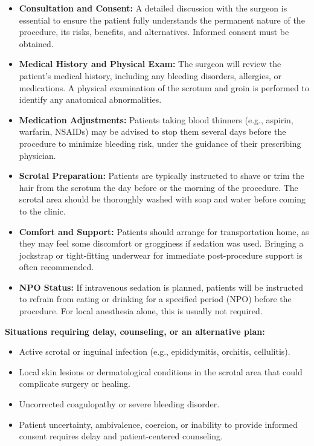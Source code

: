 \begin{itemize}
  \item \textbf{Consultation and Consent:} A detailed discussion with the surgeon is essential to ensure the patient fully understands the permanent nature of the procedure, its risks, benefits, and alternatives. Informed consent must be obtained.
  
  \item \textbf{Medical History and Physical Exam:} The surgeon will review the patient's medical history, including any bleeding disorders, allergies, or medications. A physical examination of the scrotum and groin is performed to identify any anatomical abnormalities.
  
  \item \textbf{Medication Adjustments:} Patients taking blood thinners (e.g., aspirin, warfarin, NSAIDs) may be advised to stop them several days before the procedure to minimize bleeding risk, under the guidance of their prescribing physician.
  
  \item \textbf{Scrotal Preparation:} Patients are typically instructed to shave or trim the hair from the scrotum the day before or the morning of the procedure. The scrotal area should be thoroughly washed with soap and water before coming to the clinic.
  
  \item \textbf{Comfort and Support:} Patients should arrange for transportation home, as they may feel some discomfort or grogginess if sedation was used. Bringing a jockstrap or tight-fitting underwear for immediate post-procedure support is often recommended.
  
  \item \textbf{NPO Status:} If intravenous sedation is planned, patients will be instructed to refrain from eating or drinking for a specified period (NPO) before the procedure. For local anesthesia alone, this is usually not required.
\end{itemize}

\textbf{Situations requiring delay, counseling, or an alternative plan:}
\begin{itemize}
  \item Active scrotal or inguinal infection (e.g., epididymitis, orchitis, cellulitis).
  \item Local skin lesions or dermatological conditions in the scrotal area that could complicate surgery or healing.
  \item Uncorrected coagulopathy or severe bleeding disorder.
  \item Patient uncertainty, ambivalence, coercion, or inability to provide informed consent requires delay and patient-centered counseling.
\end{itemize}

